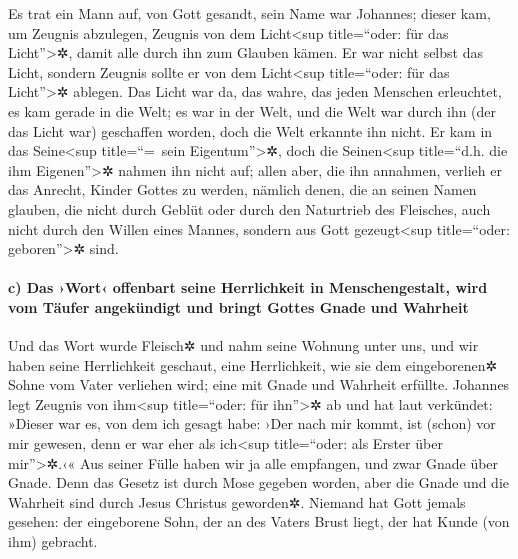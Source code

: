  Es trat ein Mann auf, von Gott gesandt, sein Name war
Johannes;  dieser kam, um Zeugnis abzulegen, Zeugnis von
dem Licht\textless sup title=``oder: für das Licht''\textgreater✲, damit
alle durch ihn zum Glauben kämen.  Er war nicht selbst das
Licht, sondern Zeugnis sollte er von dem Licht\textless sup
title=``oder: für das Licht''\textgreater✲ ablegen.  Das
Licht war da, das wahre, das jeden Menschen erleuchtet, es kam gerade in
die Welt;  es war in der Welt, und die Welt war durch ihn
(der das Licht war) geschaffen worden, doch die Welt erkannte ihn nicht.
 Er kam in das Seine\textless sup title=``=~sein
Eigentum''\textgreater✲, doch die Seinen\textless sup title=``d.h. die
ihm Eigenen''\textgreater✲ nahmen ihn nicht auf;  allen
aber, die ihn annahmen, verlieh er das Anrecht, Kinder Gottes zu werden,
nämlich denen, die an seinen Namen glauben,  die nicht
durch Geblüt oder durch den Naturtrieb des Fleisches, auch nicht durch
den Willen eines Mannes, sondern aus Gott gezeugt\textless sup
title=``oder: geboren''\textgreater✲ sind.

\hypertarget{c-das-wort-offenbart-seine-herrlichkeit-in-menschengestalt-wird-vom-tuxe4ufer-angekuxfcndigt-und-bringt-gottes-gnade-und-wahrheit}{%
\paragraph{c) Das ›Wort‹ offenbart seine Herrlichkeit in
Menschengestalt, wird vom Täufer angekündigt und bringt Gottes Gnade und
Wahrheit}\label{c-das-wort-offenbart-seine-herrlichkeit-in-menschengestalt-wird-vom-tuxe4ufer-angekuxfcndigt-und-bringt-gottes-gnade-und-wahrheit}}

 Und das Wort wurde Fleisch✲ und nahm seine Wohnung unter
uns, und wir haben seine Herrlichkeit geschaut, eine Herrlichkeit, wie
sie dem eingeborenen✲ Sohne vom Vater verliehen wird; eine mit Gnade und
Wahrheit erfüllte.  Johannes legt Zeugnis von
ihm\textless sup title=``oder: für ihn''\textgreater✲ ab und hat laut
verkündet: »Dieser war es, von dem ich gesagt habe: ›Der nach mir kommt,
ist (schon) vor mir gewesen, denn er war eher als ich\textless sup
title=``oder: als Erster über mir''\textgreater✲.‹«  Aus
seiner Fülle haben wir ja alle empfangen, und zwar Gnade über Gnade.
 Denn das Gesetz ist durch Mose gegeben worden, aber die
Gnade und die Wahrheit sind durch Jesus Christus geworden✲.
 Niemand hat Gott jemals gesehen: der eingeborene Sohn,
der an des Vaters Brust liegt, der hat Kunde (von ihm) gebracht.


